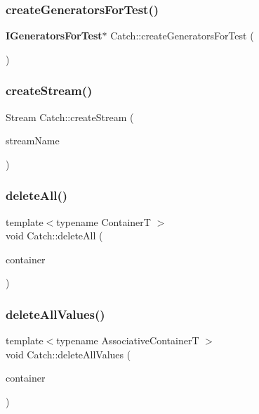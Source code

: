 \mbox{\label{namespace_catch_a3d93b31e88fd01ee9e0d20757ff64eab}} 
\subsubsection{create\+Generators\+For\+Test()}
{\footnotesize\ttfamily \textbf{ I\+Generators\+For\+Test}$\ast$ Catch\+::create\+Generators\+For\+Test (\begin{DoxyParamCaption}{ }\end{DoxyParamCaption})}

\mbox{\label{namespace_catch_ad7591011c5d99d59504ecd3384001c3e}} 
\subsubsection{create\+Stream()}
{\footnotesize\ttfamily Stream Catch\+::create\+Stream (\begin{DoxyParamCaption}\item[{std\+::string const \&}]{stream\+Name }\end{DoxyParamCaption})}

\mbox{\label{namespace_catch_aadf9786550a462740ec355f8219863a9}} 
\subsubsection{delete\+All()}
{\footnotesize\ttfamily template$<$typename ContainerT $>$ \\
void Catch\+::delete\+All (\begin{DoxyParamCaption}\item[{ContainerT \&}]{container }\end{DoxyParamCaption})\hspace{0.3cm}{\ttfamily [inline]}}

\mbox{\label{namespace_catch_af2fcec1d4bd984fe19ff8b9a432c36a8}} 
\subsubsection{delete\+All\+Values()}
{\footnotesize\ttfamily template$<$typename Associative\+ContainerT $>$ \\
void Catch\+::delete\+All\+Values (\begin{DoxyParamCaption}\item[{Associative\+ContainerT \&}]{container }\end{DoxyParamCaption})\hspace{0.3cm}{\ttfamily [inline]}}

